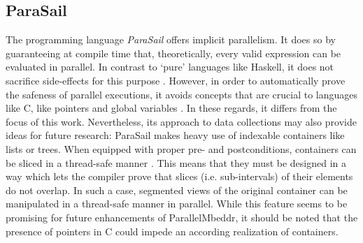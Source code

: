 \subsection{ParaSail}
The programming language \textit{ParaSail} offers implicit parallelism. It does so by guaranteeing at compile time that, theoretically, every valid expression can be evaluated in parallel. In contrast to `pure' languages like Haskell, it does not sacrifice side-effects for this purpose \cite{APointerFreePath}. However, in order to automatically prove the safeness of parallel executions, it avoids concepts that are crucial to languages like C, like pointers and global variables \cite{ParaSailLessIsMore}. In these regards, it differs from the focus of this work. Nevertheless, its approach to data collections may also provide ideas for future research: ParaSail makes heavy use of indexable containers like lists or trees. When equipped with proper pre- and postconditions, containers can be sliced in a thread-safe manner \cite{ParaSailReferenceManual}. This means that they must be designed in a way which lets the compiler prove that slices (i.e. sub-intervals) of their elements do not overlap. In such a case, segmented views of the original container can be manipulated in a thread-safe manner in parallel. While this feature seems to be promising for future enhancements of ParallelMbeddr, it should be noted that the presence of pointers in C could impede an according realization of containers.

